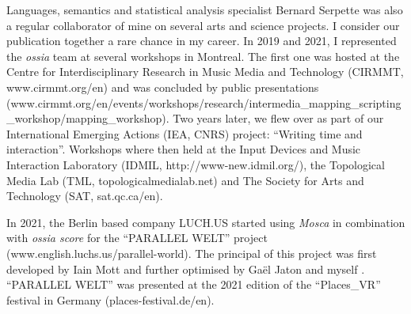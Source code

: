 \documentclass[journal,onecolumn]{IEEEtran}
\begin{document}
Languages, semantics and statistical analysis specialist Bernard Serpette was also a regular collaborator of mine on several arts and science projects. I consider our publication together\cite{serpette:aleas} a rare chance in my career. 
In 2019 and 2021, I represented the \textit{ossia} team at several workshops in Montreal. The first one was hosted at the Centre for Interdisciplinary Research in Music Media and Technology (CIRMMT, www.cirmmt.org/en) and was concluded by public presentations (www.cirmmt.org/en/events/workshops/research/intermedia\_mapping\_scripting\_workshop/mapping\_workshop). Two years later, we flew over as part of our International Emerging Actions (IEA, CNRS) project: ``Writing time and interaction''. Workshops where then held at the Input Devices and Music Interaction Laboratory (IDMIL, http://www-new.idmil.org/), the Topological Media Lab (TML, topologicalmedialab.net) and The Society for Arts and Technology (SAT, sat.qc.ca/en).


In 2021, the Berlin based company LUCH.US started using \textit{Mosca} in combination with \textit{ossia score} for the ``PARALLEL WELT'' project (www.english.luchs.us/parallel-world). The principal of this project was first developed by Iain Mott \cite{mott:botanica} and further optimised by Gaël Jaton and myself \cite{jaton:moscanica}. ``PARALLEL WELT'' was presented at the 2021 edition of the ``Places\_VR'' festival in Germany (places-festival.de/en).
\end{document}
